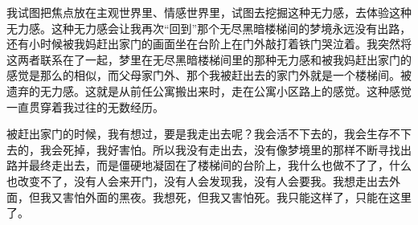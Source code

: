 
我试图把焦点放在主观世界里、情感世界里，试图去挖掘这种无力感，去体验这种无力感。这种无力感会让我再次“回到”那个无尽黑暗楼梯间的梦境\pozhehao{}永远没有出路，还有小时候被我妈赶出家门的画面\pozhehao{}坐在台阶上在门外敲打着铁门哭泣着。我突然将这两者联系在了一起，梦里在无尽黑暗楼梯间里的那种无力感和被我妈赶出家门的感觉是那么的相似，而父母家门外、那个我被赶出去的家门外就是一个楼梯间。被遗弃的无力感。这就是从前任公寓搬出来时，走在公寓小区路上的感觉。这种感觉一直贯穿着我过往的无数经历。

被赶出家门的时候，我有想过，要是我走出去呢？我会活不下去的，我会生存不下去的，我会死掉，我好害怕。所以我没有走出去，没有像梦境里的那样不断寻找出路并最终走出去，而是僵硬地凝固在了楼梯间的台阶上，我什么也做不了了，什么也改变不了，没有人会来开门，没有人会发现我，没有人会要我。我想走出去外面，但我又害怕外面的黑夜。我想死，但我又害怕死。我只能这样了，只能在这里了。


